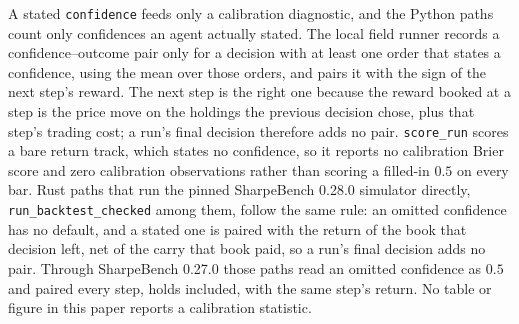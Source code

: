 A stated \texttt{confidence} feeds only a calibration diagnostic, and the Python paths count only confidences an agent actually stated. The local field runner records a confidence--outcome pair only for a decision with at least one order that states a confidence, using the mean over those orders, and pairs it with the sign of the next step's reward. The next step is the right one because the reward booked at a step is the price move on the holdings the previous decision chose, plus that step's trading cost; a run's final decision therefore adds no pair. \texttt{score\_run} scores a bare return track, which states no confidence, so it reports no calibration Brier score and zero calibration observations rather than scoring a filled-in $0.5$ on every bar. Rust paths that run the pinned SharpeBench 0.28.0 simulator directly, \texttt{run\_backtest\_checked} among them, follow the same rule: an omitted confidence has no default, and a stated one is paired with the return of the book that decision left, net of the carry that book paid, so a run's final decision adds no pair. Through SharpeBench 0.27.0 those paths read an omitted confidence as $0.5$ and paired every step, holds included, with the same step's return. No table or figure in this paper reports a calibration statistic.

